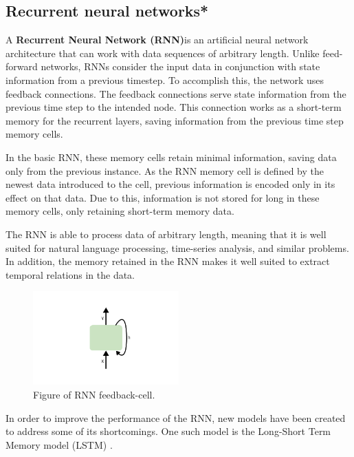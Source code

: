 \subsection{Recurrent neural networks*}
\label{section:BT:RNN}

A \textbf{Recurrent Neural Network (RNN)}is an artificial neural network architecture that can work with data sequences of arbitrary length.
Unlike feed-forward networks, RNNs consider the input data in conjunction with state information from a previous timestep.
To accomplish this, the network uses feedback connections.
The feedback connections serve state information from the previous time step to the intended node.
This connection works as a short-term memory for the recurrent layers, saving information from the previous time step memory cells.

In the basic RNN, these memory cells retain minimal information, saving data only from the previous instance.
As the RNN memory cell is defined by the newest data introduced to the cell, previous information is encoded only in its effect on that data.
Due to this, information is not stored for long in these memory cells, only retaining short-term memory data.

The RNN is able to process data of arbitrary length, meaning that it is well suited for natural language processing, time-series analysis, and similar problems.
In addition, the memory retained in the RNN makes it well suited to extract temporal relations in the data.

\begin{figure}[h!]
  \centering
  \includegraphics[width=0.5\textwidth]{./sections/BT/figures/RNN.png}
  \hfill
  \caption{Figure of RNN feedback-cell.}
  \label{fig:rnn-cell}
\end{figure}



In order to improve the performance of the RNN, new models have been created to address some of its shortcomings.
One such model is the Long-Short Term Memory model (LSTM) \cite[p.~469-472]{Geron2017}.


